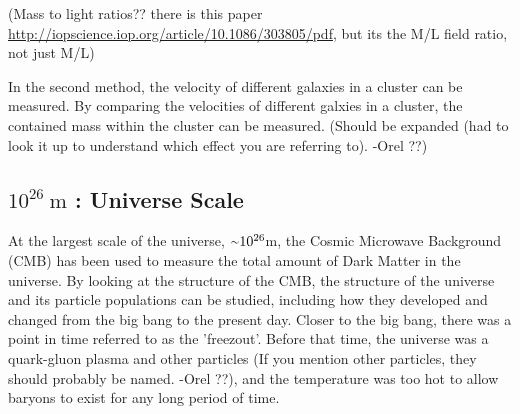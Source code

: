     {\color{red}(Mass to light ratios?? there is this paper \url{http://iopscience.iop.org/article/10.1086/303805/pdf}, but its the M/L field ratio, not just M/L)}

    In the second method, the velocity of different galaxies in a cluster can be measured.
    By comparing the velocities of different galxies in a cluster, the contained mass within the cluster can be measured.
    {\color{red}(Should be expanded (had to look it up to understand which effect you are referring to). -Orel ??)}

  \subsection{$10^{26}\:\text{m}$ : Universe Scale}
    At the largest scale of the universe, $\nicetilde 10^{26}$m, the Cosmic Microwave Background (CMB) has been used to measure the total amount of Dark Matter in the universe.
    By looking at the structure of the CMB, the structure of the universe and its particle populations can be studied, including how they developed and changed from the big bang to the present day.
    Closer to the big bang, there was a point in time referred to as the 'freezout'.
    Before that time, the universe was a quark-gluon plasma {\color{red}and other particles (If you mention other particles, they should probably be named. -Orel ??)}, and the temperature was too hot to allow baryons to exist for any long period of time.

